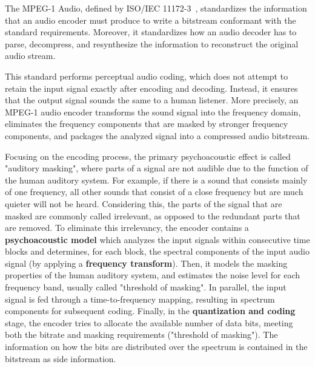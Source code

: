 The MPEG-1 Audio, defined by ISO/IEC 11172-3~\cite{11172}, standardizes the information that an audio encoder must produce to write a bitstream conformant with the standard requirements. Moreover, it standardizes how an audio decoder has to parse, decompress, and resynthesize the information to reconstruct the original audio stream.

This standard performs perceptual audio coding, which does not attempt to retain the input signal exactly after encoding and decoding. Instead, it ensures that the output signal sounds the same to a human listener. %
More precisely, an MPEG-1 audio encoder transforms the sound signal into the frequency domain, eliminates the frequency components that are masked by stronger frequency components, and packages the analyzed signal into a compressed audio bitstream.

Focusing on the encoding process, the primary psychoacoustic effect is called "auditory masking", where parts of a signal are not audible due to the function of the human auditory system. For example, if there is a sound that consists mainly of one frequency, all other sounds that consist of a close frequency but are much quieter will not be heard.  
Considering this, the parts of the signal that are masked are commonly called irrelevant, as opposed to the redundant parts that are removed. %
To eliminate this irrelevancy, the encoder contains a \textbf{psychoacoustic model} which analyzes the input signals within consecutive time blocks and determines, for each block, the spectral components of the input audio signal (by applying a \textbf{frequency transform}). Then, it models the masking properties of the human auditory system, and estimates the noise level for each frequency band, usually called "threshold of masking". 
In parallel, the input signal is fed through a time-to-frequency mapping, resulting in spectrum components for subsequent coding.  
Finally, in the \textbf{quantization and coding} stage, the encoder tries to allocate the available number of data bits, meeting both the bitrate and masking requirements ("threshold of masking"). The information on how the bits are distributed over the spectrum is contained in the bitstream as side information.

